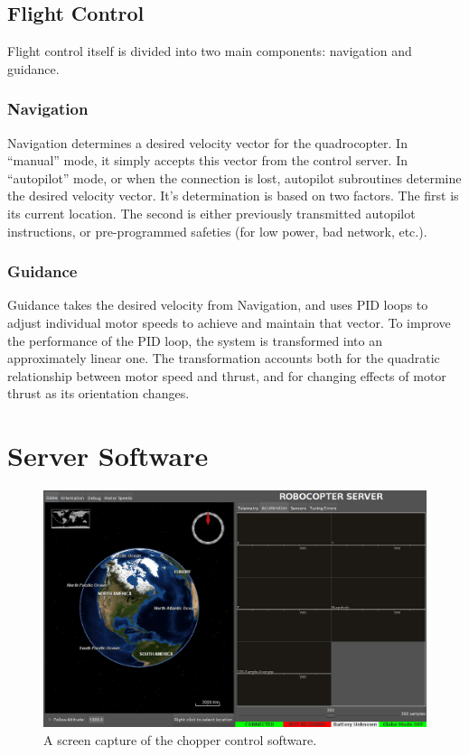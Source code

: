 \documentclass[letterpaper]{article}
\begin{document}
\subsection{Flight Control}
Flight control itself is divided into two main components: navigation
and guidance.
	
\subsubsection{Navigation}
Navigation determines a desired velocity vector for the quadrocopter.
In ``manual'' mode, it simply accepts this vector from the control
server. In ``autopilot'' mode, or when the connection is lost, autopilot
subroutines determine the desired velocity vector. It's determination
is based on two factors. The first is its current location. The second
is either previously transmitted autopilot instructions, or
pre-programmed safeties (for low power, bad network, etc.).

\subsubsection{Guidance}
Guidance takes the desired velocity from Navigation, and uses PID
loops to adjust individual motor speeds to achieve and maintain that
vector.  To improve the performance of the PID loop, the system is
transformed into an approximately linear one.  The transformation
accounts both for the quadratic relationship between motor speed and
thrust, and for changing effects of motor thrust as its orientation
changes.

\section{Server Software}
\begin{figure}[h]
  \centering
  \includegraphics[scale=0.3]{figures/globe-screenshot}
  \caption{A screen capture of the chopper control software.}
  \label{fig:globe}
\end{figure}
\end{document}

